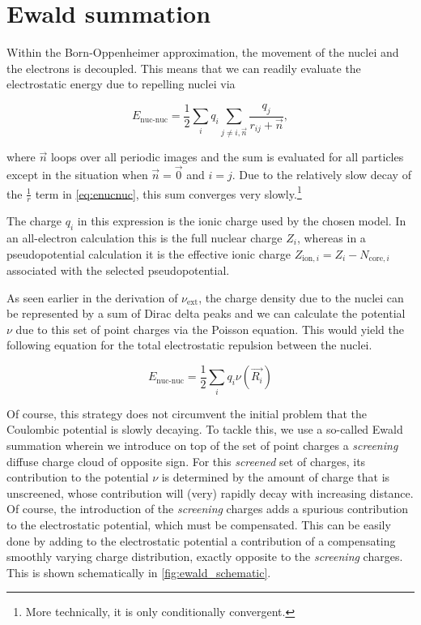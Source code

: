 \section{Ewald summation}
\label{chap:ewald}

Within the Born-Oppenheimer approximation, the movement of the nuclei and the electrons is decoupled.\cite{1927:born} This means that we can readily evaluate the electrostatic energy due to repelling nuclei via

\begin{equation}
    E_{\text{nuc-nuc}} = \frac{1}{2}\sum_{i}q_{i}\sum_{j \neq i,\vec{n}} \frac{q_{j}}{r_{ij} + \vec{n}},
    \label{eq:enucnuc}
\end{equation}

where $\vec{n}$ loops over all periodic images and the sum is evaluated for all particles except in the situation when $\vec{n} = \vec{0}$ and $i = j$. Due to the relatively slow decay of the $\frac{1}{r}$ term in \cref{eq:enucnuc}, this sum converges very slowly.\footnote{More technically, it is only conditionally convergent.}

The charge $q_i$ in this expression is the ionic charge used by the chosen model. In an all-electron calculation this is the full nuclear charge $Z_i$, whereas in a pseudopotential calculation it is the effective ionic charge $Z_{\text{ion},i}=Z_i-N_{\text{core},i}$ associated with the selected pseudopotential.

As seen earlier in the derivation of $\nu_{\text{ext}}$, the charge density due to the nuclei can be represented by a sum of Dirac delta peaks and we can calculate the potential $\nu$ due to this set of point charges via the Poisson equation. This would yield the following equation for the total electrostatic repulsion between the nuclei.

\begin{equation}
    E_{\text{nuc-nuc}} = \frac{1}{2} \sum_{i} q_{i} \nu(\vec{R_{i}})
    \label{eq:enucnuc_realspace}
\end{equation}

Of course, this strategy does not circumvent the initial problem that the Coulombic potential is slowly decaying. To tackle this, we use a so-called Ewald summation wherein we introduce on top of the set of point charges a \textit{screening} diffuse charge cloud of opposite sign.\cite{1921:ewald} For this \textit{screened} set of charges, its contribution to the potential $\nu$ is determined by the amount of charge that is unscreened, whose contribution will (very) rapidly decay with increasing distance. Of course, the introduction of the \textit{screening} charges adds a spurious contribution to the electrostatic potential, which must be compensated. This can be easily done by adding to the electrostatic potential a contribution of a compensating smoothly varying charge distribution, exactly opposite to the \textit{screening} charges. This is shown schematically in \cref{fig:ewald_schematic}.

